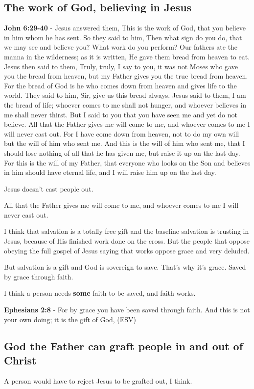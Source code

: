 \documentclass[11pt]{article}
\begin{document}
\subsection{The work of God, believing in Jesus}
\label{sec:org6d51c10}
\textbf{John 6:29-40} - Jesus answered them, This is the work of God, that you believe in him whom he has sent. So they said to him, Then what sign do you do, that we may see and believe you? What work do you perform? Our fathers ate the manna in the wilderness; as it is written, He gave them bread from heaven to eat. Jesus then said to them, Truly, truly, I say to you, it was not Moses who gave you the bread from heaven, but my Father gives you the true bread from heaven. For the bread of God is he who comes down from heaven and gives life to the world. They said to him, Sir, give us this bread always. Jesus said to them, I am the bread of life; whoever comes to me shall not hunger, and whoever believes in me shall never thirst. But I said to you that you have seen me and yet do not believe. All that the Father gives me will come to me, and whoever comes to me I will never cast out. For I have come down from heaven, not to do my own will but the will of him who sent me. And this is the will of him who sent me, that I should lose nothing of all that he has given me, but raise it up on the last day. For this is the will of my Father, that everyone who looks on the Son and believes in him should have eternal life, and I will raise him up on the last day.

Jesus doesn't cast people out.

All that the Father gives me will come to me, and whoever comes to me I will
never cast out.

I think that salvation is a totally free gift and the baseline salvation is trusting in Jesus, because of His
finished work done on the cross. But the people that oppose obeying the full gospel of Jesus saying that works oppose grace and very deluded.

But salvation is a gift and God is sovereign to save.
That's why it's grace.
Saved by grace through faith.

I think a person needs \textbf{some} faith to be saved, and faith works.

\textbf{Ephesians 2:8} - For by grace you have been saved through faith. And this is not your own doing; it is the gift of God, (ESV)

\subsection{God the Father can graft people in and out of Christ}
\label{sec:org8a2e0f3}
A person would have to reject Jesus to be grafted out, I think.
\end{document}

